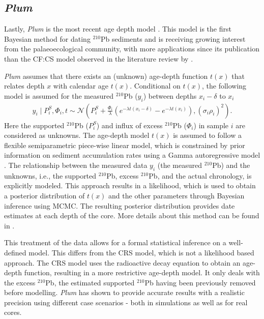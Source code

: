 \documentclass [10pt] {article}
\begin{document}
\subsection{\textit{Plum}}

Lastly, \textit{Plum} is the most recent age depth model \citep{Aquino2018}.
This model is the first Bayesian method for dating $^{210}$Pb sediments and is receiving growing interest from the palaeoecological community, with more applications since its publication than the CF:CS model observed in the literature review by \citet{Courtney2019}.

\textit{Plum} assumes that there exists an (unknown) age-depth function $t(x)$ that relates depth $x$ with calendar age $t(x)$. 
Conditional on $t(x)$, the following model is assumed for the measured $^{210}$Pb ($y_i$) between depths $x_i - \delta$ to $x_i$
\begin{eqnarray}
y_i \mid P^S_i, \Phi_i, t \sim \mathcal{N} \left(P^S_i+\frac{\Phi_i}{\lambda} \left( e^{-\lambda t(x_i-\delta)} - e^{-\lambda t(x_i)} \right), (\sigma_i\rho_i)^2 \right). 
\end{eqnarray}
Here the supported $^{210}$Pb ($P_i^S$) and influx of excess $^{210}$Pb ($\Phi_i$) in sample $i$ are considered as unknowns. The age-depth model $t(x)$ is assumed to follow a flexible semiparametric piece-wise linear model, which is constrained by prior information on sediment accumulation rates using a Gamma autoregressive model \citep{Blaauw2011}. The relationship between the measured data $y_i$ (the measured $^{210}$Pb) and the unknowns, i.e., the supported $^{210}$Pb, excess $^{210}$Pb, and the actual chronology, is explicitly modeled. This approach results in a likelihood, which is used to obtain a posterior distribution of $t(x)$ and the other parameters through Bayesian inference using MCMC. The resulting posterior distribution provides date estimates at each depth of the core. More details about this method can be found in \citep{Aquino2018}.

This treatment of the data allows for a formal statistical inference on a well-defined model. 
This differs from the CRS model, which is not a likelihood based approach. %
The CRS model uses the radioactive decay equation to obtain an age-depth function, resulting in a more restrictive age-depth model. 
It only deals with the excess $^{210}$Pb, the estimated supported $^{210}$Pb having been previously removed before modelling.
\textit{Plum} has shown to provide accurate results with a realistic precision using different case scenarios \citep{Aquino2018,Aquino2020} - both in simulations as well as for real cores.
\end{document}

